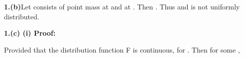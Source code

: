 \documentclass{article}
\begin{document}
\begin{Maple Normal}{
\begin{Maple Normal}{
}\end{Maple Normal}
}\end{Maple Normal}
\begin{Maple Normal}{
\begin{Maple Normal}{
\textbf{1.(b)}Let
consists of point mass
at
and
at
. Then
. Thus
and is not uniformly
distributed.}\end{Maple Normal}

}\end{Maple Normal}

\begin{Maple Normal}{
\begin{Maple Normal}{
}\end{Maple Normal}
}\end{Maple Normal}
\begin{Maple Normal}{
\begin{Maple Normal}{
\textbf{1.(c) (i) Proof:}}\end{Maple Normal}

}\end{Maple Normal}

\begin{Maple Normal}{
\begin{Maple Normal}{
Provided that the distribution function F is continuous,
for
. Then for some
,}\end{Maple Normal}

}\end{Maple Normal}
\end{document}

